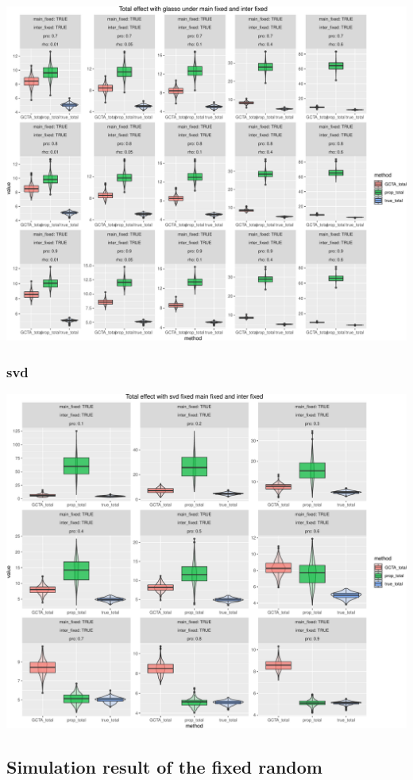 \documentclass[]{article}
\begin{document}
\includegraphics{Simulation_report_glasso_files/figure-latex/fixed fixed total glasso-3.pdf}

\subsubsection{svd}\label{svd}

\includegraphics{Simulation_report_glasso_files/figure-latex/fixed fixed total svd-1.pdf}

\subsection{Simulation result of the fixed
random}\label{simulation-result-of-the-fixed-random}
\end{document}
